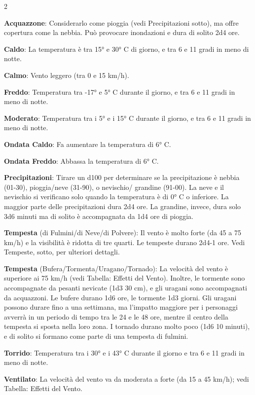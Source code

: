 \begin{multicols}{2}


\textbf{Acquazzone}: Considerarlo come pioggia (vedi Precipitazioni sotto), ma offre copertura come la nebbia. Può provocare inondazioni e dura di solito 2d4 ore.

\textbf{Caldo}: La temperatura è tra 15° e 30° C di giorno, e tra 6 e 11 gradi in meno di notte.

\textbf{Calmo}: Vento leggero (tra 0 e 15 km/h).

\textbf{Freddo}: Temperatura tra -17° e 5° C durante il giorno, e tra 6 e 11 gradi in meno di notte.

\textbf{Moderato}: Temperatura tra i 5° e i 15° C durante il giorno, e tra 6 e 11 gradi in meno di notte.

\textbf{Ondata Caldo}: Fa aumentare la temperatura di 6° C.

\textbf{Ondata Freddo}: Abbassa la temperatura di 6° C.

\textbf{Precipitazioni}: Tirare un d100 per determinare se la precipitazione è nebbia (01-30), pioggia/neve (31-90), o nevischio/ grandine (91-00). La neve e il nevischio si verificano solo quando la temperatura è di 0° C o inferiore. La maggior parte delle precipitazioni dura 2d4 ore. La grandine, invece, dura solo 3d6 minuti ma di solito è accompagnata da 1d4 ore di pioggia.

\textbf{Tempesta} (di Fulmini/di Neve/di Polvere): Il vento è molto forte (da 45 a 75 km/h) e la visibilità è ridotta di tre quarti. Le tempeste durano 2d4-1 ore. Vedi Tempeste, sotto, per ulteriori dettagli.

\textbf{Tempesta} (Bufera/Tormenta/Uragano/Tornado): La velocità del vento è superiore ai 75 km/h (vedi Tabella: Effetti del Vento). Inoltre, le tormente sono accompagnate da pesanti nevicate (1d3 \texttimes{} 30 cm), e gli uragani sono accompagnati da acquazzoni. Le bufere durano 1d6 ore, le tormente 1d3 giorni. Gli uragani possono durare fino a una settimana, ma l'impatto maggiore per i personaggi avverrà in un periodo di tempo tra le 24 e le 48 ore, mentre il centro della tempesta si sposta nella loro zona. I tornado durano molto poco (1d6 \texttimes{} 10 minuti), e di solito si formano come parte di una tempesta di fulmini.

\textbf{Torrido}: Temperatura tra i 30° e i 43° C durante il giorno e tra 6 e 11 gradi in meno di notte.

\textbf{Ventilato}: La velocità del vento va da moderata a forte (da 15 a 45 km/h); vedi Tabella: Effetti del Vento.


\end{multicols}
